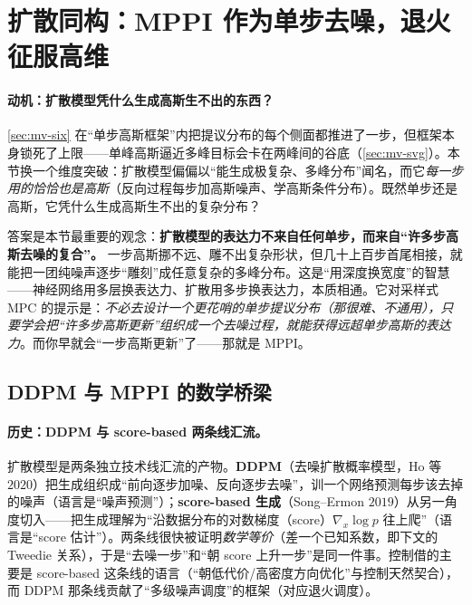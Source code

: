 \section{扩散同构：MPPI 作为单步去噪，退火征服高维}
\label{sec:mv-diffusion}

\paragraph{动机：扩散模型凭什么生成高斯生不出的东西？}
\cref{sec:mv-six} 在“单步高斯框架”内把提议分布的每个侧面都推进了一步，但框架本身锁死了上限——单峰高斯逼近多峰目标会卡在两峰间的谷底（\cref{sec:mv-svg}）。本节换一个维度突破：扩散模型偏偏以“能生成极复杂、多峰分布”闻名，而它\emph{每一步用的恰恰也是高斯}（反向过程每步加高斯噪声、学高斯条件分布）。既然单步还是高斯，它凭什么生成高斯生不出的复杂分布？

\begin{insight}
答案是本节最重要的观念：\textbf{扩散模型的表达力不来自任何单步，而来自“许多步高斯去噪的复合”。} 一步高斯挪不远、雕不出复杂形状，但几十上百步首尾相接，就能把一团纯噪声逐步“雕刻”成任意复杂的多峰分布。这是“用深度换宽度”的智慧——神经网络用多层换表达力、扩散用多步换表达力，本质相通。它对采样式 MPC 的提示是：\emph{不必去设计一个更花哨的单步提议分布（那很难、不通用），只要学会把“许多步高斯更新”组织成一个去噪过程，就能获得远超单步高斯的表达力}。而你早就会“一步高斯更新”了——那就是 MPPI。
\end{insight}

\subsection{DDPM 与 MPPI 的数学桥梁}
\label{sec:mv-bridge}

\paragraph{历史：DDPM 与 score-based 两条线汇流。}
扩散模型是两条独立技术线汇流的产物。\textbf{DDPM}（去噪扩散概率模型，Ho 等 $2020$）\cite{ho2020ddpm}把生成组织成“前向逐步加噪、反向逐步去噪”，训一个网络预测每步该去掉的噪声（语言是“噪声预测”）；\textbf{score-based 生成}（Song--Ermon $2019$）\cite{song2019score}从另一角度切入——把生成理解为“沿数据分布的对数梯度（score）$\nabla_x\log p$ 往上爬”（语言是“score 估计”）。两条线很快被证明\emph{数学等价}（差一个已知系数，即下文的 Tweedie 关系），于是“去噪一步”和“朝 score 上升一步”是同一件事。控制借的主要是 score-based 这条线的语言（“朝低代价/高密度方向优化”与控制天然契合），而 DDPM 那条线贡献了“多级噪声调度”的框架（对应退火调度）。


